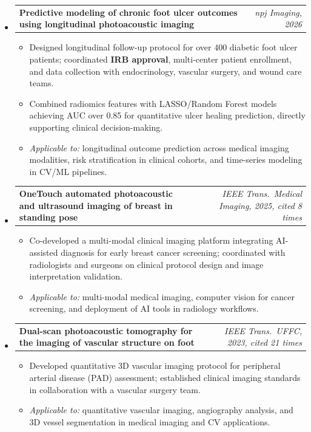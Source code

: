 \documentclass[letterpaper,10pt]{article}
\makeatletter
\newcommand{\projheading}[2]{
  \vspace{1pt}\item
  \begin{tabular*}{0.97\textwidth}[t]{l@{\extracolsep{\fill}}r}
    \textbf{#1} & \textit{\small#2} \\
  \end{tabular*}\vspace{2pt}
}
\newcommand{\projItemListStart}{\begin{itemize}[leftmargin=0.2in, topsep=3pt]}
\newcommand{\projItemListEnd}{\end{itemize}\vspace{2pt}}
\makeatother
\begin{document}
\begin{itemize}[leftmargin=0in, label={}]

  \projheading{Predictive modeling of chronic foot ulcer outcomes using longitudinal photoacoustic imaging}{npj Imaging, 2026}
  \projItemListStart
    \item Designed longitudinal follow-up protocol for over 400 diabetic foot ulcer patients; coordinated \textbf{IRB approval}, multi-center patient enrollment, and data collection with endocrinology, vascular surgery, and wound care teams.
    \item Combined radiomics features with LASSO/Random Forest models achieving AUC over 0.85 for quantitative ulcer healing prediction, directly supporting clinical decision-making.
    \item \textit{Applicable to:} longitudinal outcome prediction across medical imaging modalities, risk stratification in clinical cohorts, and time-series modeling in CV/ML pipelines.
  \projItemListEnd

  \projheading{OneTouch automated photoacoustic and ultrasound imaging of breast in standing pose}{IEEE Trans.\ Medical Imaging, 2025, cited 8 times}
  \projItemListStart
    \item Co-developed a multi-modal clinical imaging platform integrating AI-assisted diagnosis for early breast cancer screening; coordinated with radiologists and surgeons on clinical protocol design and image interpretation validation.
    \item \textit{Applicable to:} multi-modal medical imaging, computer vision for cancer screening, and deployment of AI tools in radiology workflows.
  \projItemListEnd

  \projheading{Dual-scan photoacoustic tomography for the imaging of vascular structure on foot}{IEEE Trans.\ UFFC, 2023, cited 21 times}
  \projItemListStart
    \item Developed quantitative 3D vascular imaging protocol for peripheral arterial disease (PAD) assessment; established clinical imaging standards in collaboration with a vascular surgery team.
    \item \textit{Applicable to:} quantitative vascular imaging, angiography analysis, and 3D vessel segmentation in medical imaging and CV applications.
  \projItemListEnd

\end{itemize}

\vspace{-2pt}
\end{document}
